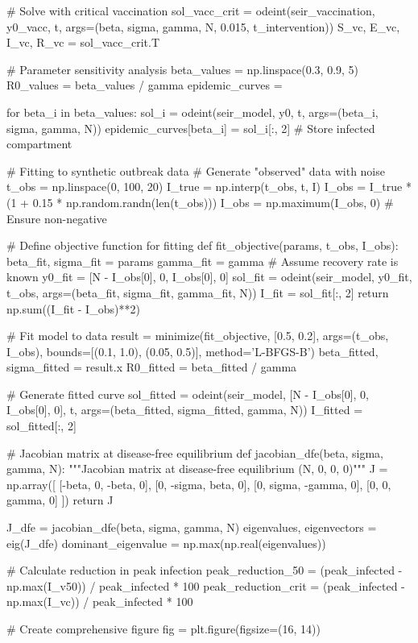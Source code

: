 \documentclass[a4paper, 11pt]{article}
\begin{document}
\begin{pycode}
# Solve with critical vaccination
sol_vacc_crit = odeint(seir_vaccination, y0_vacc, t,
                       args=(beta, sigma, gamma, N, 0.015, t_intervention))
S_vc, E_vc, I_vc, R_vc = sol_vacc_crit.T

# Parameter sensitivity analysis
beta_values = np.linspace(0.3, 0.9, 5)
R0_values = beta_values / gamma
epidemic_curves = {}

for beta_i in beta_values:
    sol_i = odeint(seir_model, y0, t, args=(beta_i, sigma, gamma, N))
    epidemic_curves[beta_i] = sol_i[:, 2]  # Store infected compartment

# Fitting to synthetic outbreak data
# Generate "observed" data with noise
t_obs = np.linspace(0, 100, 20)
I_true = np.interp(t_obs, t, I)
I_obs = I_true * (1 + 0.15 * np.random.randn(len(t_obs)))
I_obs = np.maximum(I_obs, 0)  # Ensure non-negative

# Define objective function for fitting
def fit_objective(params, t_obs, I_obs):
    beta_fit, sigma_fit = params
    gamma_fit = gamma  # Assume recovery rate is known
    y0_fit = [N - I_obs[0], 0, I_obs[0], 0]
    sol_fit = odeint(seir_model, y0_fit, t_obs, args=(beta_fit, sigma_fit, gamma_fit, N))
    I_fit = sol_fit[:, 2]
    return np.sum((I_fit - I_obs)**2)

# Fit model to data
result = minimize(fit_objective, [0.5, 0.2], args=(t_obs, I_obs),
                  bounds=[(0.1, 1.0), (0.05, 0.5)], method='L-BFGS-B')
beta_fitted, sigma_fitted = result.x
R0_fitted = beta_fitted / gamma

# Generate fitted curve
sol_fitted = odeint(seir_model, [N - I_obs[0], 0, I_obs[0], 0], t,
                    args=(beta_fitted, sigma_fitted, gamma, N))
I_fitted = sol_fitted[:, 2]

# Jacobian matrix at disease-free equilibrium
def jacobian_dfe(beta, sigma, gamma, N):
    """Jacobian matrix at disease-free equilibrium (N, 0, 0, 0)"""
    J = np.array([
        [-beta, 0, -beta, 0],
        [0, -sigma, beta, 0],
        [0, sigma, -gamma, 0],
        [0, 0, gamma, 0]
    ])
    return J

J_dfe = jacobian_dfe(beta, sigma, gamma, N)
eigenvalues, eigenvectors = eig(J_dfe)
dominant_eigenvalue = np.max(np.real(eigenvalues))

# Calculate reduction in peak infection
peak_reduction_50 = (peak_infected - np.max(I_v50)) / peak_infected * 100
peak_reduction_crit = (peak_infected - np.max(I_vc)) / peak_infected * 100

# Create comprehensive figure
fig = plt.figure(figsize=(16, 14))


\end{pycode}
\end{document}
